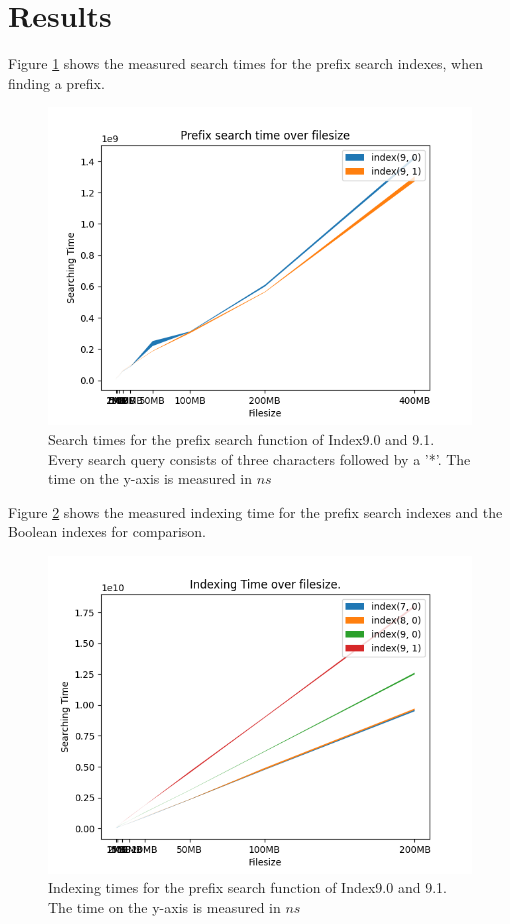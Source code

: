 \section{Results}
Figure \ref{fig:SearchtimePrefix} shows the measured search times for the prefix search indexes, when finding a prefix.

\begin{figure}[ht!]
    \centering
    \includegraphics[width=.8\textwidth]{LaTeX/Pictures/Results/Prefixsearch.png}
    \caption{Search times for the prefix search function of Index9.0 and 9.1. Every search query consists of three characters followed by a '*'. The time on the y-axis is measured in $ns$}
    \label{fig:SearchtimePrefix}
\end{figure}

Figure \ref{fig:IndexingBoolPrefi} shows the measured indexing time for the prefix search indexes and the Boolean indexes for comparison.

\begin{figure}[ht!]
    \centering
    \includegraphics[width=.8\textwidth]{LaTeX/Pictures/Results/Indexing[(7, 0), (8, 0), (9, 0), (9, 1)].png}
    \caption{Indexing times for the prefix search function of Index9.0 and 9.1. The time on the y-axis is measured in $ns$}
    \label{fig:IndexingBoolPrefi}
\end{figure}

